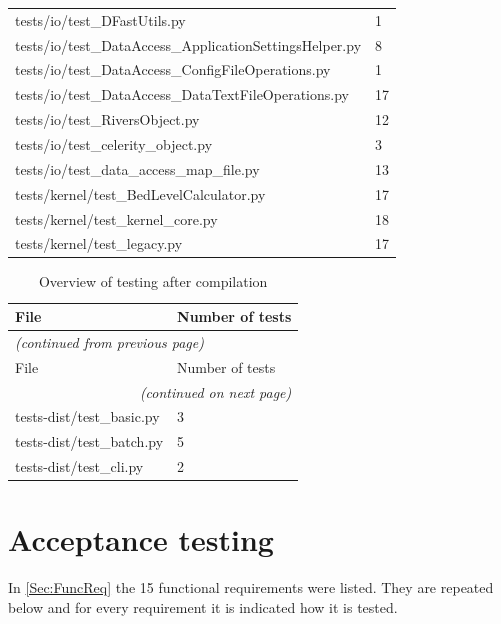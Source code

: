 \begin{longtable}{l|l}
tests/io/test\_DFastUtils.py & 1 \\
tests/io/test\_DataAccess\_ApplicationSettingsHelper.py & 8 \\
tests/io/test\_DataAccess\_ConfigFileOperations.py & 1 \\
tests/io/test\_DataAccess\_DataTextFileOperations.py & 17 \\
tests/io/test\_RiversObject.py & 12 \\
tests/io/test\_celerity\_object.py & 3 \\
tests/io/test\_data\_access\_map\_file.py & 13 \\
tests/kernel/test\_BedLevelCalculator.py & 17 \\
tests/kernel/test\_kernel\_core.py & 18 \\
tests/kernel/test\_legacy.py & 17 \\
\end{longtable}


\begin{longtable}{l|l}
\caption{Overview of testing after compilation}\label{Tab:DistRegressionTests} \\
File & Number of tests \\ \hline
\endfirsthead
\multicolumn{2}{l}{\textsl{(continued from previous page)}} \\
File & Number of tests \\ \hline
\endhead
\hline \multicolumn{2}{r}{\textsl{(continued on next page)}} \\
\endfoot
\hline
\endlastfoot

tests-dist/test\_basic.py & 3 \\
tests-dist/test\_batch.py & 5 \\
tests-dist/test\_cli.py & 2 \\
\end{longtable}

\section{Acceptance testing}

In \autoref{Sec:FuncReq} the 15 functional requirements were listed.
They are repeated below and for every requirement it is indicated how it is tested.

